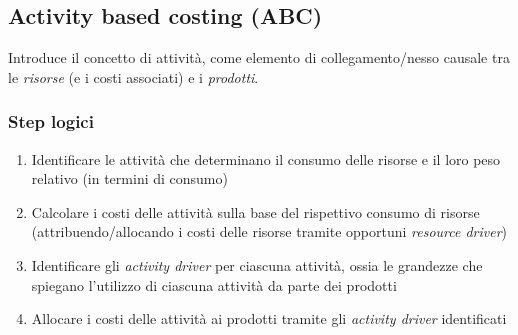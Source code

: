 \subsection{Activity based costing (ABC)}
Introduce il concetto di attività, come elemento di collegamento/nesso causale
tra le \emph{risorse} (e i costi associati) e i \emph{prodotti}.

\subsubsection{Step logici}
\begin{enumerate}
    \item Identificare le attività che determinano il consumo delle risorse e il
    loro peso relativo (in termini di consumo)
    \item Calcolare i costi delle attività sulla base del rispettivo consumo di
    risorse (attribuendo/allocando i costi delle risorse tramite opportuni
    \emph{resource driver})
    \item Identificare gli \emph{activity driver} per ciascuna attività, ossia le
    grandezze che spiegano l’utilizzo di ciascuna attività da parte dei
    prodotti
    \item Allocare i costi delle attività ai prodotti tramite gli \emph{activity driver}
    identificati
\end{enumerate}